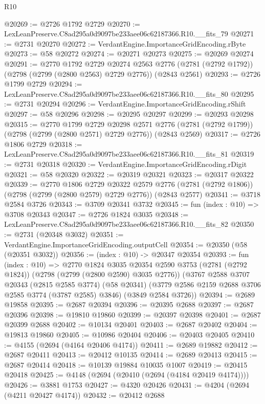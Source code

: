\begin{lexlean}{R10}
\begin{coremodule}
@20269 := @2726 @1792 @2729
@20270 := LexLeanPreserve.C8ad295a0d9097be233aee06c62187366.R10.__fits_79
@20271 := @2731 @20270
@20272 := VerdantEngine.ImportanceGridEncoding.rByte
@20273 := @58 @20272
@20274 := @20271 @20273
@20275 := @20269 @20274
@20291 := @2770
    @1792
    @2729
    @20274
    @2563
    @2776
    (@2781 (@2792 @1792))
    (@2798 (@2799 (@2800 @2563) @2729 @2776))
    (@2843 @2561)
@20293 := @2726 @1799 @2729
@20294 := LexLeanPreserve.C8ad295a0d9097be233aee06c62187366.R10.__fits_80
@20295 := @2731 @20294
@20296 := VerdantEngine.ImportanceGridEncoding.rShift
@20297 := @58 @20296
@20298 := @20295 @20297
@20299 := @20293 @20298
@20315 := @2770
    @1799
    @2729
    @20298
    @2571
    @2776
    (@2781 (@2792 @1799))
    (@2798 (@2799 (@2800 @2571) @2729 @2776))
    (@2843 @2569)
@20317 := @2726 @1806 @2729
@20318 := LexLeanPreserve.C8ad295a0d9097be233aee06c62187366.R10.__fits_81
@20319 := @2731 @20318
@20320 := VerdantEngine.ImportanceGridEncoding.rDigit
@20321 := @58 @20320
@20322 := @20319 @20321
@20323 := @20317 @20322
@20339 := @2770
    @1806
    @2729
    @20322
    @2579
    @2776
    (@2781 (@2792 @1806))
    (@2798 (@2799 (@2800 @2579) @2729 @2776))
    (@2843 @2577)
@20341 := @3718 @2584 @3726
@20343 := @3709 @20341 @3732
@20345 := fun (index : @10) => @3708 @20343
@20347 := @2726 @1824 @3035
@20348 := LexLeanPreserve.C8ad295a0d9097be233aee06c62187366.R10.__fits_82
@20350 := @2731 (@20348 @3032)
@20351 := VerdantEngine.ImportanceGridEncoding.outputCell
@20354 := @20350 (@58 (@20351 @3032))
@20356 := (index : @10) -> @20347 @20354
@20393 := fun (index : @10) =>
  @2770
    @1824
    @3035
    @20354
    @2590
    @3753
    (@2781 (@2792 @1824))
    (@2798 (@2799 (@2800 @2590) @3035 @2776))
    (@3767
      @2588
      @3707
      @20343
      (@2815 @2585 @3774)
      (@58 @20341)
      (@3779 @2586 @2159 @2688 @3706 @2585 @3774 (@3787 @2585) @3846)
      (@3849 @2584 @3726))
@20394 := @2689 @19858
@20395 := @2687 @20394
@20396 := @20395 @2688
@20397 := @2687 @20396
@20398 := @19810 @19860
@20399 := @20397 @20398
@20401 := @2687 @20399 @2688
@20402 := @10134 @20401
@20403 := @2687 @20402
@20404 := @19813 @19860
@20405 := @10986 @20404
@20406 := @20403 @20405
@20410 := @4155 (@2694 (@4164 @20406 @4174))
@20411 := @2689 @19882
@20412 := @2687 @20411
@20413 := @20412 @10135
@20414 := @2689 @20413
@20415 := @2687 @20414
@20418 := @10139 @19884 @10035 @1007
@20419 := @20415 @20418
@20425 := @4148 (@2694 (@20410 (@2694 (@4184 @20419 @4174))))
@20426 := @3881 @1753
@20427 := @4320 @20426
@20431 := @4204 (@2694 (@4211 @20427 @4174))
@20432 := @20412 @2688

\end{coremodule}
\end{lexlean}
